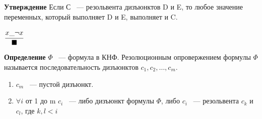 \documentclass[12pt]{article}
\begin{document}
{\bf Утверждение} Если С ~--- резольвента дизъюнктов D и E, то любое значение переменных, который выполняет D и E, выполняет и C.  

$\cfrac{x \_ \neg x}{\blacksquare}$

\begin{description}
\item{\bf Определение} $\Phi$ ~--- формула в КНФ. Резолюционным опровержением формулы $\Phi$ называется последовательность дизъюнктов $c_1, c_2, \ldots, c_m$.
\begin{enumerate}
\item $c_m$ ~--- пустой дизъюнкт.
\item $\forall i$ от 1 до m $c_i$ ~--- либо дизъюнкт формулы $\Phi$, либо $c_i$ ~--- резольвента $c_k$ и $c_l$,  где $k, l < i$
\end{enumerate}
\end{description}
\end{document}
